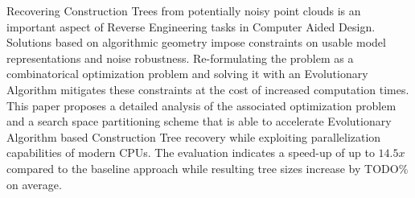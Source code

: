 Recovering Construction Trees from potentially noisy point clouds is an important aspect of Reverse Engineering tasks in Computer Aided Design. 
Solutions based on algorithmic geometry impose constraints on usable model representations and noise robustness. 
Re-formulating the problem as a combinatorical optimization problem and solving it with an Evolutionary Algorithm mitigates these constraints at the cost of increased computation times. 
This paper proposes a detailed analysis of the associated optimization problem and a search space partitioning scheme that is able to accelerate Evolutionary Algorithm based Construction Tree recovery while exploiting parallelization capabilities of modern CPUs.
The evaluation indicates a speed-up of up to $14.5x$ compared to the baseline approach while resulting tree sizes increase by TODO$\%$ on average.    
